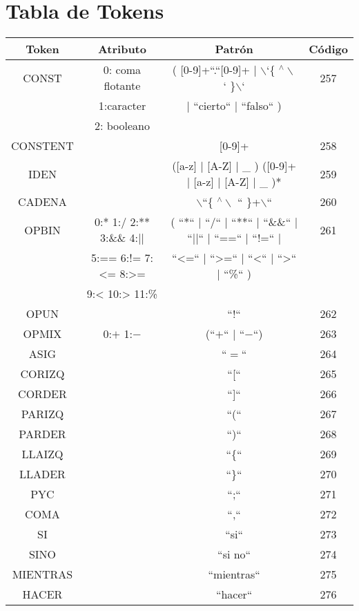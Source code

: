 \newpage
\section{Tabla de Tokens}

\begin{table}[H]
\centering
\small
\begin{tabular}{| c | c | c | c |}
  \hline
  Token & Atributo & Patrón & Código \\ \hline
  CONST & 0: coma flotante & (  [0-9]+``.``[0-9]+ | $\backslash$`\{  $^\wedge \backslash$ ` \}$\backslash$`  & 257 \\
  & 1:caracter & | ``cierto`` | ``falso`` ) &  \\
  & 2: booleano & & \\ \hline
  CONSTENT & & [0-9]+ & 258 \\ \hline
  IDEN & & ([a-z] | [A-Z] | \_ ) ([0-9]+ | [a-z] | [A-Z] | \_ )* & 259 \\ \hline
  CADENA & &  $\backslash$``\{  $^\wedge \backslash$ `` \}+$\backslash$``& 260 \\ \hline
  OPBIN & 0:*  1:/  2:**  3:\&\& 4:|| & ( ``*``  |  ``/``  |  ``**``  |  ``\&\&``  |  ``||`` |  ``==`` |  ``$!$=``  |   & 261 \\
  &   5:== 6:!= 7:\textless{}= 8:>=   & ``\textless{}=``  |  ``\textgreater=``  |  ``\textless`` |  ``\textgreater``  |  ``\%``  )& \\
  & 9:< 10:> 11:\% & & \\ \hline
OPUN & & ``$!$`` &  262 \\ \hline
OPMIX & 0:$+$ 1:$-$ & (``$+$`` | ``$-$``) & 263 \\ \hline
ASIG &  & ``$=$`` & 264 \\ \hline
CORIZQ & & ``[`` & 265 \\ \hline
CORDER & & ``]`` & 266\\ \hline
PARIZQ & & ``(`` & 267\\ \hline
PARDER & & ``)`` & 268\\ \hline
LLAIZQ & & ``\{`` & 269\\ \hline
LLADER & & ``\}`` & 270\\ \hline
PYC & & ``;`` & 271\\ \hline
COMA & & ``,`` & 272\\ \hline
SI & & ``si`` & 273\\ \hline
SINO & & ``si no`` & 274\\ \hline
MIENTRAS & & ``mientras`` & 275\\ \hline
HACER& & ``hacer`` & 276\\ \hline

\end{tabular}
\end{table}
